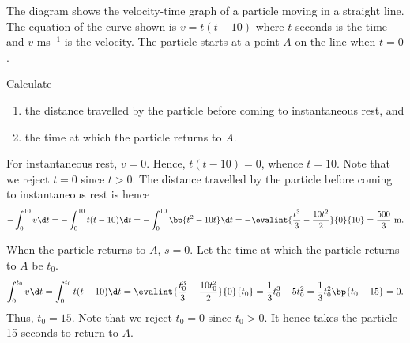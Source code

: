 \begin{problem}
    \begin{center}
    \end{center}
    The diagram shows the velocity-time graph of a particle moving in a straight line. The equation of the curve shown is $v = t(t - 10)$ where $t$ seconds is the time and $v$ ms$^{-1}$ is the velocity. The particle starts at a point $A$ on the line when $t = 0$.

    Calculate
    \begin{enumerate}
        \item the distance travelled by the particle before coming to instantaneous rest, and
        \item the time at which the particle returns to $A$.
    \end{enumerate}
\end{problem}
\begin{solution}
    \begin{ppart}
        For instantaneous rest, $v = 0$. Hence, $t(t-10) = 0$, whence $t = 10$. Note that we reject $t = 0$ since $t > 0$. The distance travelled by the particle before coming to instantaneous rest is hence \[-\int_0^{10} v \d t = -\int_0^{10} t(t-10) \d t = -\int_0^{10} \bp{t^2 - 10t} \d t = -\evalint{\frac{t^3}3 - \frac{10t^2}2}{0}{10} = \frac{500}3 \text{ m}.\]
    \end{ppart}
    \begin{ppart}
        When the particle returns to $A$, $s = 0$. Let the time at which the particle returns to $A$ be $t_0$. \[\int_0^{t_0} v \d t = \int_0^{t_0} t(t-10) \d t = \evalint{\frac{t_0^3}3 - \frac{10t_0^2}2}{0}{t_0} = \frac13 t_0^3 - 5t_0^2 = \frac13t_0^2 \bp{t_0 - 15} = 0.\] Thus, $t_0 = 15$. Note that we reject $t_0 = 0$ since $t_0 > 0$. It hence takes the particle 15 seconds to return to $A$.
    \end{ppart}
\end{solution}